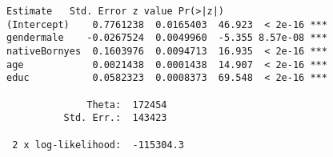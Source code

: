 \documentclass[12pt]{article}
\begin{document}
\begin{center}
\begin{minipage}{13cm}
\begin{Verbatim}[frame=single]
               Estimate   Std. Error z value Pr(>|z|)    
(Intercept)    0.7761238  0.0165403  46.923  < 2e-16 ***
gendermale    -0.0267524  0.0049960  -5.355 8.57e-08 ***
nativeBornyes  0.1603976  0.0094713  16.935  < 2e-16 ***
age            0.0021438  0.0001438  14.907  < 2e-16 ***
educ           0.0582323  0.0008373  69.548  < 2e-16 ***

              Theta:  172454 
          Std. Err.:  143423

 2 x log-likelihood:  -115304.3 
\end{Verbatim}
\end{minipage}
\end{center}


\pagebreak
\end{document}
